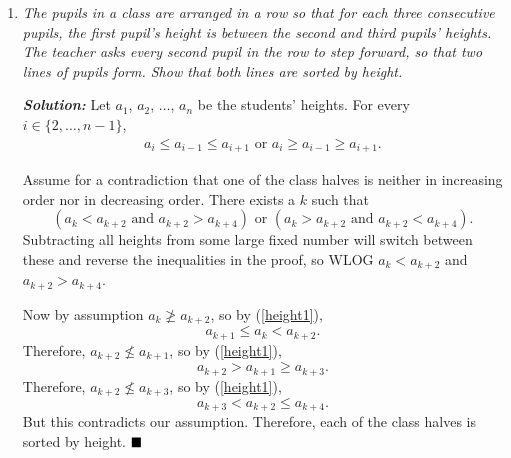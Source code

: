 \documentclass[12pt]{article}
\newcommand{\sol}{\textbf{\textit{Solution: }}}
\begin{document}
\begin{enumerate}[topsep=2\bigskipamount,itemsep=\bigskipamount]
\item \textit{The pupils in a class are arranged in a row so that for each three consecutive pupils, the first pupil's height is between the second and third pupils' heights. The teacher asks every second pupil in the row to step forward, so that two lines of pupils form. Show that both lines are sorted by height.}

\sol
Let $a_1$, $a_2$, $\dots$, $a_n$ be the students' heights. For every $i\in\{2, \dots, n-1\}$, 
\begin{align}
a_i \leqslant a_{i-1} \leqslant a_{i+1} \text{ or } a_i \geqslant a_{i-1} \geqslant a_{i+1}.\label{height1}
\end{align}

Assume for a contradiction that one of the class halves is neither in increasing order nor in decreasing order. There exists a $k$ such that
$$(a_k < a_{k+2} \text{ and } a_{k+2} > a_{k+4}) \text{ or } (a_k > a_{k+2} \text{ and } a_{k+2} < a_{k+4}).$$
Subtracting all heights from some large fixed number will switch between these and reverse the inequalities in the proof, so WLOG $a_k < a_{k+2}$ and $a_{k+2} > a_{k+4}$.

Now by assumption $a_k \ngeqslant a_{k+2}$, so by (\ref{height1}),
$$a_{k+1} \leqslant a_k < a_{k+2}.$$
Therefore, $a_{k+2} \nleqslant a_{k+1}$, so by (\ref{height1}),
$$a_{k+2} > a_{k+1} \geqslant a_{k+3}.$$
Therefore, $a_{k+2} \nleqslant a_{k+3}$, so by (\ref{height1}),
$$a_{k+3} < a_{k+2} \leqslant a_{k+4}.$$
But this contradicts our assumption. Therefore, each of the class halves is sorted by height. $\hfill\blacksquare$
\end{enumerate}
\end{document}
